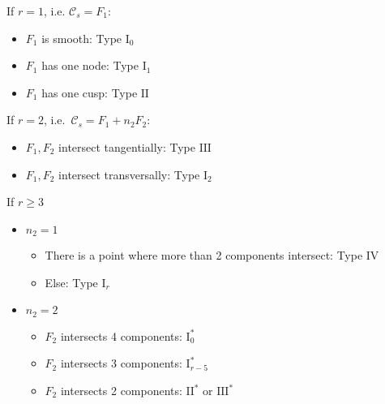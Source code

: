 \noindent If $r = 1 $, i.e. $\mathcal{C} _s = F_1$:
\begin{itemize}
	\item $F_1$ is smooth: Type $\text{I}_0$
	\item $F_1$ has one node: Type $\text{I}_1$
	\item $F_1$ has one cusp: Type $\text{II}$
\end{itemize}
If $r = 2$, i.e.\ $\mathcal{C} _s = F_1 + n_2 F_2$:
\begin{itemize}
	\item $F_1, F_2$ intersect tangentially: Type $\text{III}$ 
	\item $F_1, F_2$ intersect transversally: Type $\text{I}_2$
\end{itemize}
If $r \ge 3$
 \begin{itemize}
	\item  $n_2 = 1$
		\begin{itemize}
			\item There is a point where more than 2 components intersect: Type IV
			\item Else: Type $\text{I}_r$
		\end{itemize}
	\item $n_2 = 2$
		\begin{itemize}
			\item $F_2$ intersects 4 components: $\text{I}^*_0$
			\item  $F_2$ intersects 3 components: $\text{I}^*_{r - 5}$
			\item $F_2$ intersects 2 components: $\text{II}^*$ or $\text{III}^*$ 
		\end{itemize}
\end{itemize}


